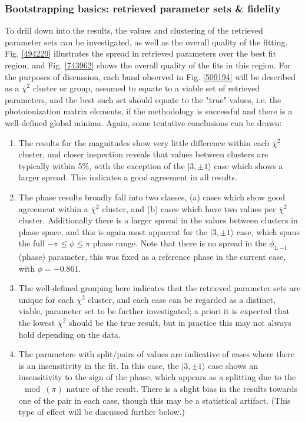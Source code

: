 \documentclass[10pt]{article}
\begin{document}
\subsubsection{Bootstrapping basics: retrieved parameter sets \& fidelity\label{sec:bootstrap-fidelity}}

To drill down into the results, the values and clustering of the retrieved parameter sets can be investigated, as well as the overall quality of the fitting. Fig. \ref{494229} illustrates the spread in retrieved parameters over the best fit region, and Fig. \ref{743962} shows the overall quality of the fits in this region. For the purposes of discussion, each band observed in Fig. \ref{509194} will be described as a $\bar{\chi}^2$ cluster or group, assumed to equate to a viable set of retrieved parameters, and the best such set should equate to the "true" values, i.e. the photoionization matrix elements, if the methodology is successful and there is a well-defined global minima. Again, some tentative conclusions can be drawn:

\begin{enumerate}
\item The results for the magnitudes show very little difference within each $\bar{\chi}^2$ cluster, and closer inspection reveals that values between clusters are typically within 5\%, with the exception of the $|3,\pm1\rangle$ case which shows a larger spread. This indicates a good agreement in all results.
\item The phase results broadly fall into two classes, (a) cases which show good agreement within a $\bar{\chi}^2$ cluster, and (b) cases which have two values per $\bar{\chi}^2$ cluster. Additionally there is a larger spread in the values between clusters in phase space, and this is again most apparent for the $|3,\pm1\rangle$ case, which spans the full $-\pi\leq\phi\leq\pi$ phase range. Note that there is no spread in the $\phi_{1,-1}$ (phase) parameter, this was fixed as a reference phase in the current case, with $\phi=-0.861$.
\item The well-defined grouping here indicates that the retrieved parameter sets are unique for each $\bar{\chi}^2$ cluster, and each case can be regarded as a distinct, viable, parameter set to be further investigated; a priori it is expected that the lowest $\bar{\chi}^2$ should be the true result, but in practice this may not always hold depending on the data.
\item The parameters with split/pairs of values are indicative of cases where there is an insensitivity in the fit. In this case, the $|3,\pm1\rangle$ case shows an insensitivity to the sign of the phase, which appears as a splitting due to the $\mod(\pi)$ nature of the result. There is a slight bias in the results towards one of the pair in each case, though this may be a statistical artifact. (This type of effect will be discussed further below.)
\end{enumerate}
\end{document}

